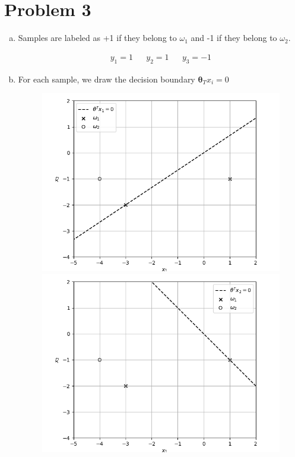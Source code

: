 \documentclass[a4paper, 10pt, twoside]{article}
\begin{document}
\section*{Problem 3}

\begin{enumerate}[a)]
    \item Samples are labeled as +1 if they belong to $\omega_1$ and -1 if they belong to $\omega_2$.

          \begin{align*}
              y_1 = 1 &  & y_2 = 1 &  & y_3 = -1
          \end{align*}

    \item For each sample, we draw the decision boundary $\bm{\theta}_T x_i = 0$

          \begin{figure}[h]
              \centering
              \begin{minipage}[t]{0.32\textwidth}
                  \centering
                  \includegraphics[width=\textwidth]{graph5.png}
              \end{minipage}\hfill
              \begin{minipage}[t]{0.32\textwidth}
                  \centering
                  \includegraphics[width=\textwidth]{graph7.png}

\end{minipage}
\end{figure}
\end{enumerate}
\end{document}
